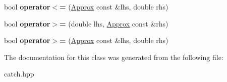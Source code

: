 \begin{DoxyCompactItemize}
bool {\bfseries operator$<$=} (\hyperlink{classCatch_1_1Detail_1_1Approx}{Approx} const \&lhs, double rhs)
\item 
\mbox{\label{classCatch_1_1Detail_1_1Approx_a4e60095c615a0e6bdd6e8663cd24090b}} 
bool {\bfseries operator$>$=} (double lhs, \hyperlink{classCatch_1_1Detail_1_1Approx}{Approx} const \&rhs)
\item 
\mbox{\label{classCatch_1_1Detail_1_1Approx_adaba11ee9aabb4d51d4855f09aa7f7df}} 
bool {\bfseries operator$>$=} (\hyperlink{classCatch_1_1Detail_1_1Approx}{Approx} const \&lhs, double rhs)
\end{DoxyCompactItemize}


The documentation for this class was generated from the following file\+:\begin{DoxyCompactItemize}
\item 
catch.\+hpp\end{DoxyCompactItemize}

